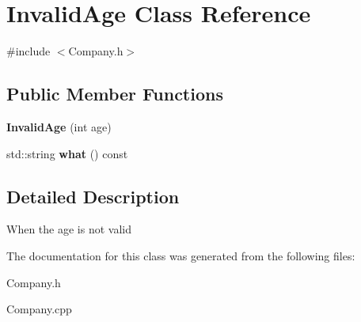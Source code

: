 \hypertarget{class_invalid_age}{}\section{Invalid\+Age Class Reference}
\label{class_invalid_age}


{\ttfamily \#include $<$Company.\+h$>$}

\subsection*{Public Member Functions}
\begin{DoxyCompactItemize}
\item 
\mbox{\label{class_invalid_age_ae1ed3ee78dd4c589a64d939b90aa09f3}} 
{\bfseries Invalid\+Age} (int age)
\item 
\mbox{\label{class_invalid_age_a6961abe914f41e975a7b0ebd526e3ea4}} 
std\+::string {\bfseries what} () const
\end{DoxyCompactItemize}


\subsection{Detailed Description}
When the age is not valid 

The documentation for this class was generated from the following files\+:\begin{DoxyCompactItemize}
\item 
Company.\+h\item 
Company.\+cpp\end{DoxyCompactItemize}
